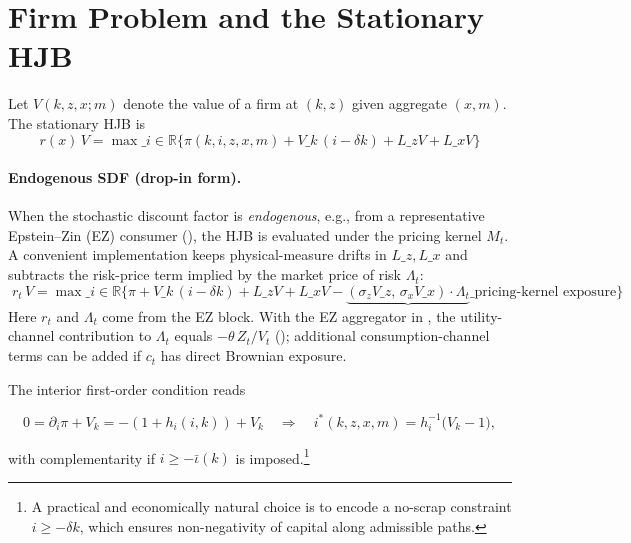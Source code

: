 \documentclass[11pt,letterpaper,oneside]{article}
\numberwithin{equation}{section}
\newcommand{\ac}[1]{{\mdseries\textsc{#1}}}
\newcommand{\R}{\mathbb{R}}
\newcommand{\1}{\mathbf{1}}
\newcommand{\Lz}{L\_z}
\newcommand{\Lx}{L\_x}
\newcommand{\kbar}{\bar\iota}
\begin{document}
\section{Firm Problem and the Stationary HJB}

Let $V(k,z,x;m)$ denote the value of a firm at $(k,z)$ given aggregate $(x,m)$. The stationary \ac{HJB} is
\begin{equation}
\boxed{\; r(x)\,V 
  = \max\_{i\in\R} \Big\{ \pi(k,i,z,x,m) + V\_k\,(i-\delta k) + \Lz V + \Lx V \Big\} \;}
\tag{HJB}\label{eq:HJB}
\end{equation}

\paragraph{Endogenous SDF (drop-in form).}
When the stochastic discount factor is \emph{endogenous}, e.g., from a representative Epstein--Zin (EZ) consumer (), the HJB is evaluated under the pricing kernel $M_t$. A convenient implementation keeps physical-measure drifts in $\Lz,\Lx$ and subtracts the risk-price term implied by the market price of risk $\Lambda_t$:
\begin{equation}\label{eq:HJB-EZ}
\boxed{\; r_t\,V 
  = \max\_{i\in\R} \Big\{ \pi + V\_k\,(i-\delta k) + \Lz V + \Lx V 
      - \underbrace{(\sigma_z V\_z,\, \sigma_x V\_x)\cdot\Lambda_t}\_{\text{pricing-kernel exposure}} \Big\} \;}
\end{equation}
Here $r_t$ and $\Lambda_t$ come from the EZ block. With the EZ aggregator in , the utility-channel contribution to $\Lambda_t$ equals $-\theta\,Z_t/V_t$ (); additional consumption-channel terms can be added if $c_t$ has direct Brownian exposure.

The interior first-order condition reads

$$
0=\partial_i\pi+V_k=-(1+h_i(i,k))+V_k
\quad\Longrightarrow\quad
i^*(k,z,x,m)=h_i^{-1}\!\big(V_k-1\big),
$$

with complementarity if $i\ge -\kbar(k)$ is imposed.\footnote{A practical and economically natural choice is to encode a no-scrap constraint $i\ge -\delta k$, which ensures non-negativity of capital along admissible paths.}
\end{document}
